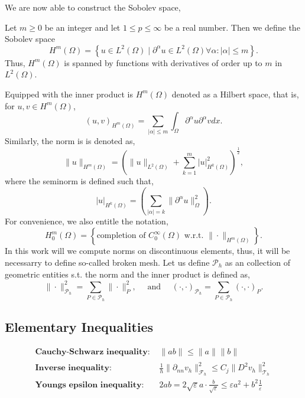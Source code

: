 We are now able to construct the Sobolev space,

\begin{definition}
    Let $m\ge 0$ be an integer and let $1 \le  p \le  \infty$ be a real number. Then we define the Sobolev space
\[
H^{m}\left( \Omega  \right) = \left\{ u \in L^{2}\left( \Omega  \right)  \mid  \partial ^{\alpha } u \in L^{2}\left( \Omega  \right)  \forall \alpha : \left\lvert \alpha  \right\rvert  \le m \right\}.
\]
Thus, $H^{m}( \Omega ) $ is spanned by functions with derivatives of order up to $m$ in $L^{2}( \Omega ) $.
\end{definition}
Equipped with the inner product is $H^{m}\left( \Omega  \right) $  denoted as a Hilbert space, that is, for $u,v \in H^{m}\left( \Omega  \right) $, \[
    \left( u,v \right) _{H^{m}\left( \Omega   \right) } = \sum_{\left\lvert \alpha  \right\rvert  \le  m}^{}  \int_{\Omega }^{} \partial ^{\alpha } u \partial ^{\alpha } v dx.
\]
Similarly, the norm is is denoted as, \[
\| u \|_{ H^{m}\left( \Omega  \right)  }^{  }  = \left( \| u \|_{ L^{2}\left( \Omega  \right)    } + \sum_{k = 1}^{m}  \left\lvert u \right\rvert ^{2} _{  H^{k}\left( \Omega  \right) }\right) ^{\frac{1}{2}},
\]
where the seminorm is defined such that, \[
\left\lvert u \right\rvert _{H^{k}\left( \Omega  \right) } = \left( \sum_{\left\lvert \alpha  \right\rvert  = k}^{} \| \partial ^{\alpha }u \|_{ \Omega  }^{ 2 }  \right).
\]
For convenience, we also entitle the notation,
\[
H^{m}_{0} \left( \Omega  \right) = \left\{ \text{completion of }C_{0}^{\infty}\left( \Omega  \right) \text{ w.r.t. } \| \cdot  \|_{H^{m}\left( \Omega  \right)   }^{  }  \right\}.
\]
In this work will we compute norms on discontinuous elements, thus, it will be necessarry to define so-called broken mesh. Let us define $\mathcal{P} _{h}$ as an collection of geometric entities s.t. the norm and the inner product is defined as,
\[
 \| \cdot \|_{\mathcal{P}_{h}}^{2} = \sum_{P \in \mathcal{P} _{h}}^{} \| \cdot  \|_{ P }^{2  }, \quad \text{ and } \quad
 (\cdot ,\cdot )_{\mathcal{P}
_{h}}^{} = \sum_{P \in \mathcal{P} _{h}}^{} (\cdot ,\cdot )_{ P }^{  } .
\]



\subsection{Elementary Inequalities}%
\label{sub:elementary_inequalities}
\[
\begin{split}
    \textbf{Cauchy-Schwarz inequality: } & \| ab \|_{  }^{  }  \le \| a \|_{  }^{  } \| b \|_{  }^{  }   \\
    \textbf{Inverse inequality: } & \frac{1}{h}\| \partial _{nn}  v_{h} \|_{\mathcal{F}_{h}   }^{2  }  \le C_{j} \| D ^2 v_{h} \|_{ \mathcal{T} _{h} }^{ 2 }   \\
    \textbf{Youngs epsilon inequality: } & 2ab =   2\sqrt{\varepsilon }a\cdot    \frac{b}{\sqrt{\varepsilon } } \le \varepsilon a^2+ b^2 \frac{1}{\varepsilon }
\end{split}
\]


